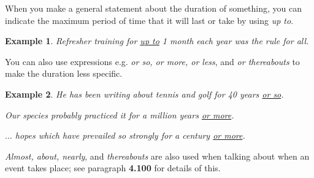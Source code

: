\documentclass[oneside]{book}
\numberwithin{equation}{section}
\newtheorem{example}{Example}[section]
\begin{document}
When you make a general statement about the duration of something, you can indicate the maximum period of time that it will last or take by using \textit{up to}.
\begin{example}
    Refresher training for \underline{up to} 1 month each year was the rule for all.
\end{example}
You can also use expressions e.g. \textit{or so, or more, or less}, and \textit{or thereabouts} to make the duration less specific.
\begin{example}
    He has been writing about tennis and golf for 40 years \underline{or so}.
    
    Our species probably practiced it for a million years \underline{or more}.
    
    $\ldots$ hopes which have prevailed so strongly for a century \underline{or more}.
\end{example}
\textit{Almost, about, nearly}, and \textit{thereabouts} are also used when talking about when an event takes place; see paragraph \textbf{4.100} for details of this.
\end{document}
